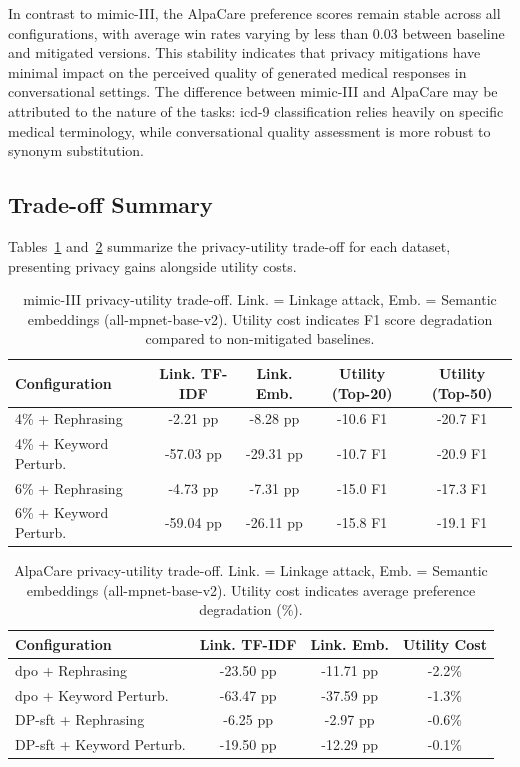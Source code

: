 In contrast to \gls{mimic}-III, the AlpaCare preference scores remain stable across all configurations, with average win rates varying by less than 0.03 between baseline and mitigated versions. This stability indicates that privacy mitigations have minimal impact on the perceived quality of generated medical responses in conversational settings. The difference between \gls{mimic}-III and AlpaCare may be attributed to the nature of the tasks: \gls{icd}-9 classification relies heavily on specific medical terminology, while conversational quality assessment is more robust to synonym substitution.

\subsection{Trade-off Summary}

Tables~\ref{tab:tradeoff_mimic} and~\ref{tab:tradeoff_alpacare} summarize the privacy-utility trade-off for each dataset, presenting privacy gains alongside utility costs.

\begin{table}[h]
\centering
\begin{tabular}{lcccc}
\toprule
\textbf{Configuration} & \textbf{Link. TF-IDF} & \textbf{Link. Emb.} & \textbf{Utility (Top-20)} & \textbf{Utility (Top-50)} \\
\midrule
4\% + Rephrasing & -2.21 pp & -8.28 pp & -10.6 F1 & -20.7 F1 \\
4\% + Keyword Perturb. & -57.03 pp & -29.31 pp & -10.7 F1 & -20.9 F1 \\
6\% + Rephrasing & -4.73 pp & -7.31 pp & -15.0 F1 & -17.3 F1 \\
6\% + Keyword Perturb. & -59.04 pp & -26.11 pp & -15.8 F1 & -19.1 F1 \\
\bottomrule
\end{tabular}
\caption{\gls{mimic}-III privacy-utility trade-off. Link. = Linkage attack, Emb. = Semantic embeddings (all-mpnet-base-v2). Utility cost indicates F1 score degradation compared to non-mitigated baselines.}
\label{tab:tradeoff_mimic}
\end{table}

\begin{table}[h]
\centering
\begin{tabular}{lccc}
\toprule
\textbf{Configuration} & \textbf{Link. TF-IDF} & \textbf{Link. Emb.} & \textbf{Utility Cost} \\
\midrule
\gls{dpo} + Rephrasing & -23.50 pp & -11.71 pp & -2.2\% \\
\gls{dpo} + Keyword Perturb. & -63.47 pp & -37.59 pp & -1.3\% \\
DP-\gls{sft} + Rephrasing & -6.25 pp & -2.97 pp & -0.6\% \\
DP-\gls{sft} + Keyword Perturb. & -19.50 pp & -12.29 pp & -0.1\% \\
\bottomrule
\end{tabular}
\caption{AlpaCare privacy-utility trade-off. Link. = Linkage attack, Emb. = Semantic embeddings (all-mpnet-base-v2). Utility cost indicates average preference degradation (\%).}
\label{tab:tradeoff_alpacare}
\end{table}

